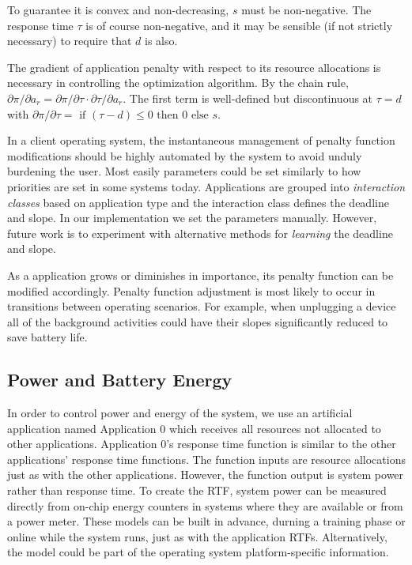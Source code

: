To guarantee it is convex and non-decreasing, $s$ must be non-negative.
The response time $\tau$  is of course non-negative, and it may be sensible (if not strictly necessary) to require that $d$ is also.

The gradient of application penalty with respect to its resource allocations is necessary in controlling the optimization algorithm.
By the chain rule, $\partial\pi/\partial a_r = \partial\pi/\partial\tau\cdot\partial\tau/\partial a_r$.
The first term is well-defined but discontinuous at $\tau = d$ with
$\partial\pi/\partial\tau = \mbox{ if } (\tau - d) \leq 0 \mbox{ then } 0 \mbox{ else } s$.

In a client operating system, the instantaneous management of penalty function modifications should be highly automated by the system to avoid unduly burdening the user. Most easily parameters could be set similarly to how priorities are set in some systems today. Applications are grouped into \emph{interaction classes} based on application type and the interaction class defines the deadline and slope.  In our implementation we set the parameters manually. However, future work is to experiment with alternative methods for \emph{learning} the deadline and slope.

 
As a application grows or diminishes in importance, its penalty function can be modified accordingly.  Penalty function adjustment is most likely to occur in transitions between operating scenarios.  For example, when unplugging a device all of the background activities could have their slopes significantly reduced to save battery life.

\subsection*{Power and Battery Energy}
In order to control power and energy of the system, we use an artificial application named Application 0 which receives all resources not allocated to other applications. Application 0's response time function is similar to the other applications' response time functions.  The function inputs are resource allocations just as with the other applications.  However, the function output is system power rather than response time.   To create the RTF, system power can be measured directly from on-chip energy counters in systems where they are available or from a power meter.  These models can be built in advance, durning a training phase or online while the system runs, just as with the application RTFs.  Alternatively, the model could be part of the operating system platform-specific information. 


